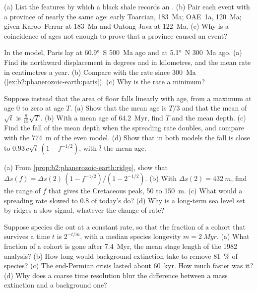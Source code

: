 \begin{exercise}[$\star\star$]\label{exo:b2:phanerozoic-earth:8}
(a) List the features by which a black shale records an . (b) Pair each
event with a province of nearly the same age: early Toarcian, \qty{183}{Ma}; OAE~1a,
\qty{120}{Ma}; given Karoo--Ferrar at \qty{183}{Ma} and Ontong Java at \qty{122}{Ma}. (c) Why is a
coincidence of ages not enough to prove that a province caused an event?
\end{exercise}

\begin{exercise}[$\star\star$]\label{exo:b2:phanerozoic-earth:9}
In the model, Paris lay at \ang{60.9}~S \qty{500}{Ma} ago and at \ang{5.1}~N \qty{300}{Ma} ago.
(a) Find its northward displacement in degrees and in kilometres, and the mean rate in
centimetres a year. (b) Compare with the rate since \qty{300}{Ma}
(\cref{ex:b2:phanerozoic-earth:paris}). (c) Why is the rate a minimum?
\end{exercise}

\begin{exercise}[$\star\star\star$]\label{exo:b2:phanerozoic-earth:10}
Suppose instead that the area of floor falls linearly with age, from a maximum at age 0 to zero
at age $T$. (a) Show that the mean age is $T/3$ and that the mean of $\sqrt t$ is
$\tfrac{8}{15}\sqrt T$. (b) With a mean age of \qty{64.2}{Myr}, find $T$ and the mean depth. (c)
Find the fall of the mean depth when the spreading rate doubles, and compare with the
\qty{774}{m} of the even model. (d) Show that in both models the fall is close to $0.93\,c\sqrt{\bar
t}\,(1 - f^{-1/2})$, with $\bar t$ the mean age.
\end{exercise}

\begin{exercise}[$\star\star\star$]\label{exo:b2:phanerozoic-earth:11}
(a) From \cref{prop:b2:phanerozoic-earth:ridge}, show that $\Delta s(f) = \Delta s(2)\,(1 -
f^{-1/2})/(1 - 2^{-1/2})$. (b) With $\Delta s(2) = \qty{432}{m}$, find the range of $f$ that
gives the Cretaceous peak, 50 to \qty{150}{m}. (c) What would a spreading rate slowed to 0.8 of
today's do? (d) Why is a long-term sea level set by ridges a slow signal, whatever the change of
rate?
\end{exercise}

\begin{exercise}[$\star\star\star$]\label{exo:b2:phanerozoic-earth:12}
Suppose species die out at a constant rate, so that the fraction of a cohort that survives a time
$t$ is $2^{-t/m}$, with a median species longevity $m = \qty{2}{Myr}$. (a) What fraction of a
cohort is gone after \qty{7.4}{Myr}, the mean stage length of the 1982 analysis? (b) How long
would background extinction take to remove \qty{81}{\percent} of species? (c) The end-Permian
crisis lasted about \qty{60}{kyr}. How much faster was it? (d) Why does a coarse time
resolution blur the difference between a mass extinction and a background one?
\end{exercise}


